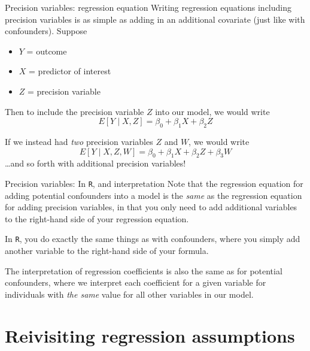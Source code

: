 \documentclass[10pt,t]{beamer}
\begin{document}
\begin{frame}{Precision variables: regression equation}
Writing regression equations including precision variables is as simple as adding in an additional covariate (just like with confounders). Suppose

\vspace{0.3cm}

\begin{itemize}
	\item $Y$ = outcome
	\item $X$ = predictor of interest
	\item $Z$ = precision variable
\end{itemize}

\vspace{0.3cm}

Then to include the precision variable $Z$ into our model, we would write
$$
E[Y \mid X, Z] = \beta_0 + \beta_1 X + \beta_2 Z
$$

If we instead had \textit{two} precision variables $Z$ and $W$, we would write
$$
E[Y \mid X, Z, W] = \beta_0 + \beta_1 X + \beta_2 Z + \beta_3 W
$$
\dots and so forth with additional precision variables!

\end{frame}

\begin{frame}{Precision variables: In \texttt{R}, and interpretation}
Note that the regression equation for adding potential confounders into a model is the \textit{same} as the regression equation for adding precision variables, in that you only need to add additional variables to the right-hand side of your regression equation.

\vspace{0.3cm}

In \texttt{R}, you do exactly the same things as with confounders, where you simply add another variable to the right-hand side of your formula.

\vspace{0.3cm}

The interpretation of regression coefficients is also the same as for potential confounders, where we interpret each coefficient for a given variable for individuals with \textit{the same} value for all other variables in our model. 


\end{frame}

\section{Reivisiting regression assumptions}
\end{document}
